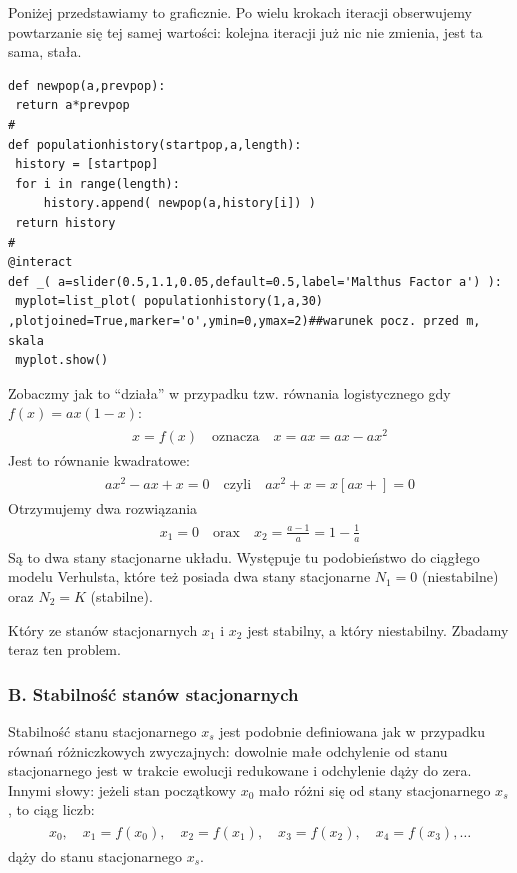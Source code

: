 \documentclass[a4paper,12pt,polish]{sphinxmanual}
\begin{document}
Poniżej przedstawiamy to graficznie. Po wielu krokach iteracji obserwujemy powtarzanie się tej samej wartości: kolejna iteracji już nic nie zmienia, jest ta sama, stała.


\begin{verbatim}
def newpop(a,prevpop):
 return a*prevpop
#
def populationhistory(startpop,a,length):
 history = [startpop]
 for i in range(length):
     history.append( newpop(a,history[i]) )
 return history
#
@interact
def _( a=slider(0.5,1.1,0.05,default=0.5,label='Malthus Factor a') ):
 myplot=list_plot( populationhistory(1,a,30) ,plotjoined=True,marker='o',ymin=0,ymax=2)##warunek pocz. przed m, skala
 myplot.show()
\end{verbatim}


Zobaczmy jak to ``działa'' w przypadku tzw. równania logistycznego gdy $f(x) = ax (1-x)$:
\label{ch1/chI031:equation-eqn12}\begin{gather}
\begin{split}x = f(x) \quad \mbox{oznacza} \quad x=ax  = ax - ax^2\end{split}\label{ch1/chI031-eqn12}
\end{gather}
Jest to równanie kwadratowe:
\label{ch1/chI031:equation-eqn13}\begin{gather}
\begin{split}ax^2 -ax +x = 0 \quad \mbox{czyli} \quad  ax^2 + x  =  x [ax + ] = 0\end{split}\label{ch1/chI031-eqn13}
\end{gather}
Otrzymujemy dwa rozwiązania
\label{ch1/chI031:equation-eqn14}\begin{gather}
\begin{split}x_1 = 0 \quad \mbox{orax} \quad x_2 = \frac{a-1}{a} = 1 - \frac{1}{a}\end{split}\label{ch1/chI031-eqn14}
\end{gather}
Są to dwa stany stacjonarne układu. Występuje tu podobieństwo do ciągłego modelu Verhulsta, które też posiada dwa stany stacjonarne $N_1 = 0$ (niestabilne)  oraz $N_2 = K$ (stabilne).

Który ze stanów stacjonarnych  $x_1$   i   $x_2$  jest stabilny, a który niestabilny.  Zbadamy teraz ten problem.


\subsubsection{B. Stabilność stanów stacjonarnych}
\label{ch1/chI031:b-stabilnosc-stanow-stacjonarnych}
Stabilność stanu stacjonarnego $x_s$  jest podobnie definiowana jak w przypadku równań różniczkowych zwyczajnych: dowolnie małe odchylenie od stanu stacjonarnego   jest w trakcie ewolucji redukowane i odchylenie dąży do zera. Innymi słowy: jeżeli stan początkowy $x_0$ mało różni się od stany stacjonarnego $x_s$, to ciąg liczb:
\label{ch1/chI031:equation-eqn15}\begin{gather}
\begin{split}x_0, \quad x_1=f(x_0), \quad x_2 = f(x_1), \quad x_3 = f(x_2), \quad x_4 = f(x_3), \dots\end{split}\label{ch1/chI031-eqn15}
\end{gather}
dąży do stanu stacjonarnego $x_s$.
\end{document}
